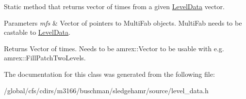 Static method that returns vector of times from a given \mbox{\hyperlink{classsledgehamr_1_1LevelData}{Level\+Data}} vector. 


\begin{DoxyParams}{Parameters}
{\em mfs} & Vector of pointers to Multi\+Fab objects. Multi\+Fab needs to be castable to \mbox{\hyperlink{classsledgehamr_1_1LevelData}{Level\+Data}}. \\
\hline
\end{DoxyParams}
\begin{DoxyReturn}{Returns}
Vector of times. Needs to be amrex\+::\+Vector to be usable with e.\+g. amrex\+::\+Fill\+Patch\+Two\+Levels. 
\end{DoxyReturn}


The documentation for this class was generated from the following file\+:\begin{DoxyCompactItemize}
\item 
/global/cfs/cdirs/m3166/buschman/sledgehamr/source/level\+\_\+data.\+h\end{DoxyCompactItemize}
